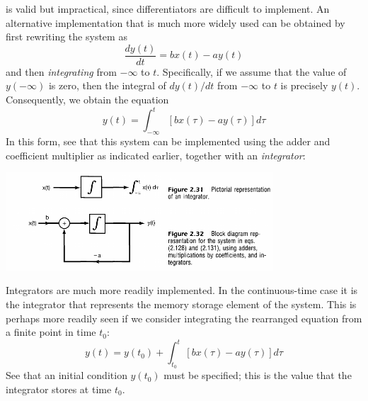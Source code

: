 \documentclass{report}
\begin{document}
is valid but impractical, since differentiators are difficult to implement. 
An alternative implementation that is much more widely used can be obtained by first rewriting the system as
\begin{equation*}
\frac{dy(t)}{dt}=bx(t)-ay(t)
\end{equation*}
and then \textit{integrating} from $-\infty$ to $t$. 
Specifically, if we assume that the value of $y(-\infty)$ is zero, then the integral of $dy(t)/dt$ 
from $-\infty$ to $t$ is precisely $y(t)$. Consequently, we obtain the equation
\begin{equation*}
y(t)=\int^t_{-\infty}[bx(\tau)-ay(\tau)]d\tau
\end{equation*}
In this form, see that this system can be implemented using the adder and coefficient multiplier as indicated earlier, together 
with an \textit{integrator}:
\begin{center}
\includegraphics[width=10cm]{a52}
\end{center}
Integrators are much more readily implemented. In the continuous-time case it is the integrator that represents the memory storage
element of the system. This is perhaps more readily seen if we consider integrating the rearranged equation from a finite point in time
$t_0$:
\begin{equation*}
y(t)=y(t_0)+\int^t_{t_0}[bx(\tau)-ay(\tau)]d\tau
\end{equation*}
See that an initial condition $y(t_0)$ must be specified; this is the value that the integrator stores at time $t_0$.
\newpage
\end{document}

